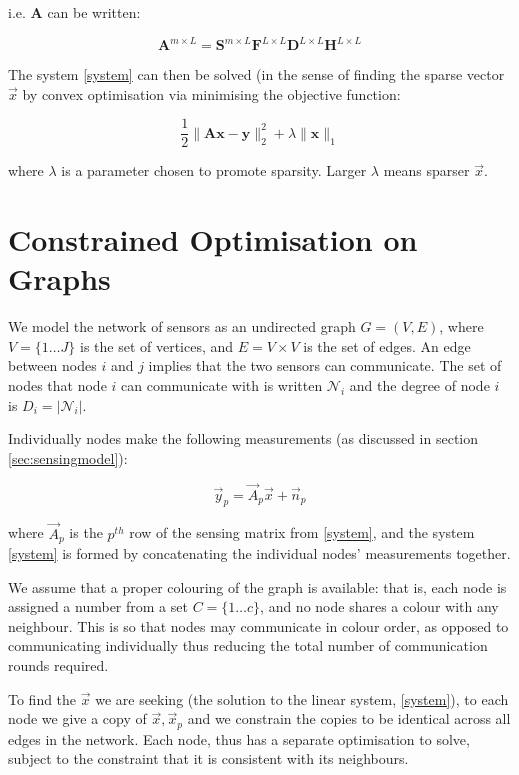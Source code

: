 \documentclass[conference]{IEEEtran}
\begin{document}
i.e. \(\textbf{A}\) can be written: 

\begin{equation}
\textbf{A}^{m\times L} = \textbf{S}^{m\times L} \textbf{F}^{L\times L} \textbf{D}^{L \times L} \textbf{H}^{L \times L}
\end{equation}

The system  \ref{system} can then be solved (in the sense of finding the sparse vector \(\vec{x}\) by convex optimisation via minimising the objective function:

\begin{equation}
\frac{1}{2}\|\textbf{Ax}-\textbf{y}\|_2^2 + \lambda \|\textbf{x}\|_1
\end{equation}

where \(\lambda\) is a parameter chosen to promote sparsity. Larger \(\lambda\) means sparser \(\vec{x}\).

\section{Constrained Optimisation on Graphs}\label{sec:opt-on-graphs}

We model the network of sensors as an undirected graph \(G = \left(V,E\right)\), where \(V = \{1 \ldots J\}\) is the set of vertices, and \(E = V \times V\) is the set of edges. An edge between nodes \(i\) and \(j\) implies that the two sensors can communicate. The set of nodes that node \(i\) can communicate with is written \(\mathcal{N}_i\) and the degree of node \(i\) is \(D_i = |\mathcal{N}_i|\). 

Individually nodes make the following measurements (as discussed in section \ref{sec:sensingmodel}):

\begin{equation}
\vec{y}_p = \vec{A}_p\vec{x} + \vec{n}_p
\end{equation}

where \(\vec{A}_p\) is the \(p^{th} \) row of the sensing matrix from \eqref{system}, and the system \eqref{system} is formed by concatenating the individual nodes' measurements together.

We assume that a proper colouring of the graph is available: that is, each node is assigned a number from a set \(C = \{1 \ldots c \} \), and no node shares a colour with any neighbour. This is so that nodes may communicate in colour order, as opposed to communicating individually thus reducing the total number of communication rounds required. 

To find the \(\vec{x}\) we are seeking (the solution to the linear system, \ref{system}), to each node we give a copy of \(\vec{x}, \vec{x}_p\) and we constrain the copies to be identical across all edges in the network. Each node, thus has a separate optimisation to solve, subject to the constraint that it is consistent with its neighbours.
\end{document}

